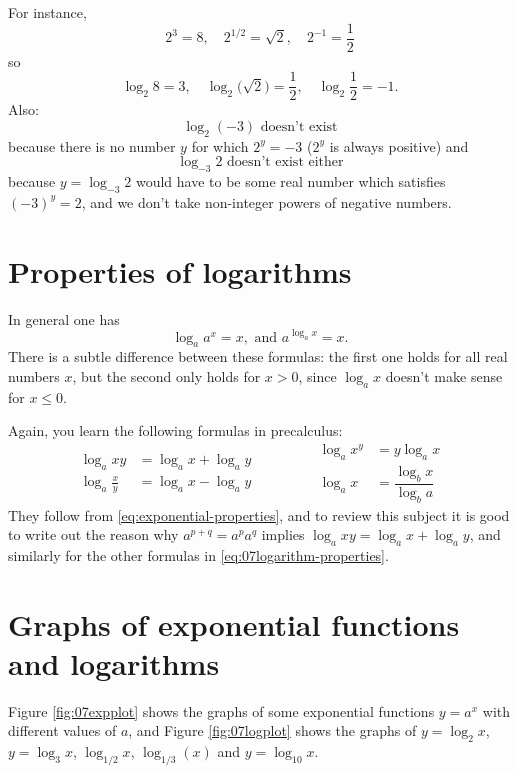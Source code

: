For instance,
\[
2^3 = 8, \quad
2^{1/2} = \sqrt2,\quad
2^{-1}= \frac12
\]
so
\[
\log_2 8 = 3,\quad
\log_2\bigl(\sqrt{2}\bigr) = \frac12,\quad
\log_2 \frac12 = -1.
\]
Also:
\[
\log_2 (-3) \text{ doesn't exist}
\]
because there is no number $y$ for which $2^y = -3$ ($2^y$ is always positive)
and
\[
\log_{-3}2 \text{ doesn't exist either}
\]
because $y=\log_{-3}2$ would have to be some real number which satisfies $(-3)^y
= 2$, and we don't take non-integer powers of negative numbers.






\section{Properties of logarithms} %
In general one has
\[
\log_a a^x = x,  \text{ and }  a^{\log_a x}=x.
\]
There is a subtle difference between these formulas: the first one holds for all
real numbers $x$, but the second only holds for $x>0$, since $\log _a x$ doesn't
make sense for $x\leq 0$.




Again, you learn the following formulas in precalculus:
\begin{equation}
  \begin{aligned}
    \log_a xy &= \log_a x + \log _a y \\
    \log_a \frac xy &= \log_ax-\log_a y
  \end{aligned}
  \qquad\qquad
  \begin{aligned}
    \log_a x^y &= y\log_a x \\
    \log_a x &= \dfrac{\log_b x}{\log_b a}
  \end{aligned}
  \label{eq:07logarithm-properties}
\end{equation}
They follow from \eqref{eq:exponential-properties}, and to review this
subject it is good to write out the reason why $a^{p+q} = a^p a^q$
implies $\log_a xy = \log_a x + \log_a y$, and similarly for the other
formulas in \eqref{eq:07logarithm-properties}.




\section{Graphs of exponential functions and logarithms} %
Figure \ref{fig:07expplot} shows the graphs of some exponential
functions $y=a^x$ with different values of $a$, and Figure
\ref{fig:07logplot} shows the graphs of $y=\log_2 x$, $y=\log_3 x$,
$\log_{1/2}x$, $\log_{1/3}(x)$ and $y=\log_{10}x$.




